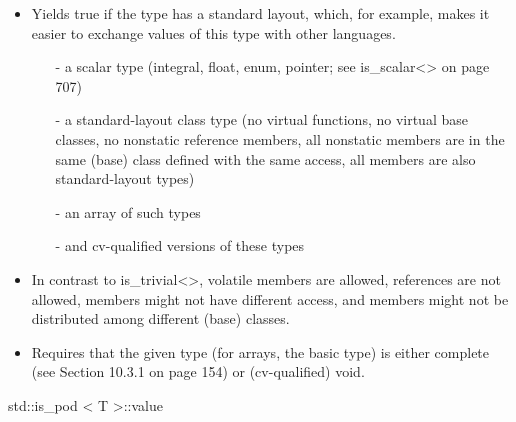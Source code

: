 \begin{itemize}
\item 
Yields true if the type has a standard layout, which, for example, makes it easier to exchange values of this type with other languages.

\begin{itemize}
\item [-]
a scalar type (integral, float, enum, pointer; see is\_scalar<> on page 707)

\item [-]
a standard-layout class type (no virtual functions, no virtual base classes, no nonstatic reference members, all nonstatic members are in the same (base) class defined with the same access, all members are also standard-layout types)

\item [-]
an array of such types

\item [-]
and cv-qualified versions of these types
\end{itemize}

\item 
In contrast to is\_trivial<>, volatile members are allowed, references are not allowed, members might not have different access, and members might not be distributed among different (base) classes.

\item 
Requires that the given type (for arrays, the basic type) is either complete (see Section 10.3.1 on page 154) or (cv-qualified) void.
\end{itemize}

std::is\_pod < T >::value

